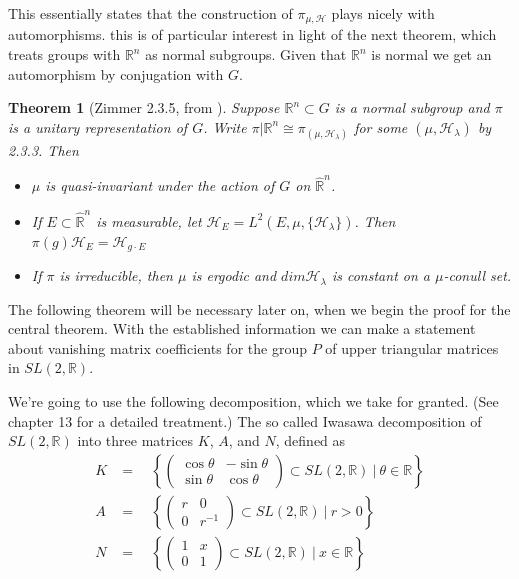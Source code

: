 \documentclass[
  12pt
]{article}
\newtheorem{thm}{Theorem}[section]
\theoremstyle{plain}
\newcommand{\G}{\ensuremath{G}\xspace}
\newcommand{\bbr}{\ensuremath{\mathbb{R}}\xspace}
\newcommand{\hilb}{\ensuremath{\mathscr{H}}\xspace}
\newcommand{\sltr}{\ensuremath{SL(2, \mathbb{R})}\xspace}
\begin{document}
  This essentially states that the construction of $\pi_{\mu, \hilb}$ plays
  nicely with automorphisms. this is of particular interest in light of the
  next theorem, which treats groups with $\bbr^n$ as normal subgroups. Given
  that $\bbr^n$ is normal we get an automorphism by conjugation with \G.

  \begin{thm}[Zimmer 2.3.5, from  \cite{mackey76}]
    \label{thm:2.3.5}
    Suppose $\mathbb{R}^n \subset G$ is a normal subgroup and $\pi$ is a unitary representation of $G$.
    Write $\pi | \mathbb{R}^n \cong \pi_{(\mu, \mathscr{H}_{\lambda})}$ for some
    $(\mu, \mathscr{H}_{\lambda})$ by 2.3.3. Then  
    \begin{itemize}
      \item $\mu$ is quasi-invariant under the action of $G$ on $\hat{\mathbb{R}}^n$. 
      \item If $E \subset \hat{\mathbb{R}}^n$ is measurable, let
        $\mathscr{H}_E = L^2(E, \mu, \{\mathscr{H}_{\lambda}\})$.
        Then $\pi(g)\mathscr{H}_E = \mathscr{H}_{g \cdot E}$
      \item If $\pi$ is irreducible, then $\mu$ is ergodic and $dim\mathscr{H}_{\lambda}$ is
        constant on a $\mu$-conull set.
    \end{itemize}
  \end{thm}

  The following theorem will be necessary later on, when we begin the proof for
  the central theorem. With the established information we can make a statement
  about vanishing matrix coefficients for the group $P$ of upper triangular
  matrices in \sltr.


  We're going to use the following decomposition, which we take for
  granted. (See \citeauthor{Hilgert2012}\cite{Hilgert2012} chapter 13 for a detailed treatment.)
  The so called Iwasawa decomposition of $SL(2, \mathbb{R})$ into three
  matrices $K$, $A$, and $N$, defined as
  \begin{align}
  K & =\quad \left\{ \begin{pmatrix} \cos\theta & -\sin\theta \\ \sin\theta & \cos\theta\end{pmatrix} \subset SL(2, \mathbb{R})  \ | \ \theta \in \mathbb{R} \right\} \\
  A & =\quad \left\{ \begin{pmatrix} r & 0 \\ 0 & r^{-1} \end{pmatrix} \subset SL(2, \mathbb{R})  \ | \ r > 0 \right\} \\
  N & =\quad \left\{ \begin{pmatrix} 1 & x \\ 0 & 1 \end{pmatrix} \subset SL(2, \mathbb{R})  \ | \ x \in \mathbb{R} \right\}\\
  \end{align}
\end{document}
